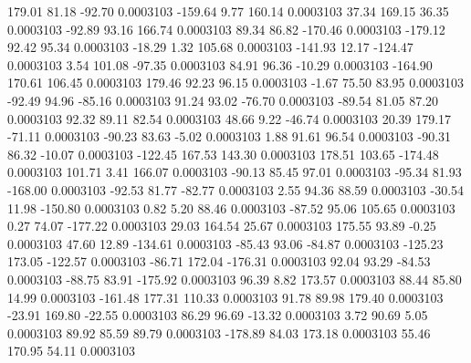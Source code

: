       179.01       81.18      -92.70     0.0003103
     -159.64        9.77      160.14     0.0003103
       37.34      169.15       36.35     0.0003103
      -92.89       93.16      166.74     0.0003103
       89.34       86.82     -170.46     0.0003103
     -179.12       92.42       95.34     0.0003103
      -18.29        1.32      105.68     0.0003103
     -141.93       12.17     -124.47     0.0003103
        3.54      101.08      -97.35     0.0003103
       84.91       96.36      -10.29     0.0003103
     -164.90      170.61      106.45     0.0003103
      179.46       92.23       96.15     0.0003103
       -1.67       75.50       83.95     0.0003103
      -92.49       94.96      -85.16     0.0003103
       91.24       93.02      -76.70     0.0003103
      -89.54       81.05       87.20     0.0003103
       92.32       89.11       82.54     0.0003103
       48.66        9.22      -46.74     0.0003103
       20.39      179.17      -71.11     0.0003103
      -90.23       83.63       -5.02     0.0003103
        1.88       91.61       96.54     0.0003103
      -90.31       86.32      -10.07     0.0003103
     -122.45      167.53      143.30     0.0003103
      178.51      103.65     -174.48     0.0003103
      101.71        3.41      166.07     0.0003103
      -90.13       85.45       97.01     0.0003103
      -95.34       81.93     -168.00     0.0003103
      -92.53       81.77      -82.77     0.0003103
        2.55       94.36       88.59     0.0003103
      -30.54       11.98     -150.80     0.0003103
        0.82        5.20       88.46     0.0003103
      -87.52       95.06      105.65     0.0003103
        0.27       74.07     -177.22     0.0003103
       29.03      164.54       25.67     0.0003103
      175.55       93.89       -0.25     0.0003103
       47.60       12.89     -134.61     0.0003103
      -85.43       93.06      -84.87     0.0003103
     -125.23      173.05     -122.57     0.0003103
      -86.71      172.04     -176.31     0.0003103
       92.04       93.29      -84.53     0.0003103
      -88.75       83.91     -175.92     0.0003103
       96.39        8.82      173.57     0.0003103
       88.44       85.80       14.99     0.0003103
     -161.48      177.31      110.33     0.0003103
       91.78       89.98      179.40     0.0003103
      -23.91      169.80      -22.55     0.0003103
       86.29       96.69      -13.32     0.0003103
        3.72       90.69        5.05     0.0003103
       89.92       85.59       89.79     0.0003103
     -178.89       84.03      173.18     0.0003103
       55.46      170.95       54.11     0.0003103
